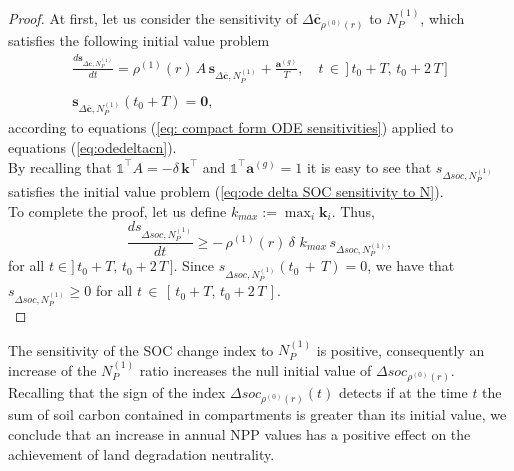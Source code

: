 \begin{proof}
At first, let us consider the sensitivity of $\Delta \mathbf{\overline c}_{\rho^{(0)}(r)}$ to $N_P^{(1)}$, which satisfies the following initial value problem
\begin{equation}\label{eq:ivp sens delta c to N}
\begin{array}{l}
     \displaystyle \frac{d \mathbf{s}_{\Delta \mathbf{\overline c},N_P^{(1)}}}{dt}=\rho^{(1)}(r)\,A\, \mathbf{s}_{\Delta \mathbf{\overline c},N_P^{(1)}}+\displaystyle \frac{\mathbf{a}^{(g)}}{T},\quad t\,\in \,]\,t_0+T,\,t_0+2\,T\,] \\\\
     \mathbf{s}_{\Delta \mathbf{\overline c},N_P^{(1)}}(t_0+T)=\mathbf{0},
\end{array}
\end{equation}
according to equations (\ref{eq: compact form ODE sensitivities}) applied to equations (\ref{eq:odedeltacn}). \\
By recalling that
 $\mathds{1}^\intercal A =-\delta\, \mathbf{k}^\intercal $ and $\mathds{1}^\intercal \mathbf{a}^{(g)}=1$ it is easy to see that $s_{\Delta soc,N_P^{(1)}}$ satisfies the initial value problem (\ref{eq:ode delta SOC sensitivity to N}).\\

\noindent  To complete the proof, let us define $k_{max}:=\max_i{\mathbf{k}_i}$. Thus,
$$ \frac{d s_{\Delta soc,N_P^{(1)}}}{dt}\geq - \,\rho^{(1)}(r)\,\delta \,\,k_{max} \,s_{\Delta soc,N_P^{(1)}}, 
$$
for all $t\in]\,t_0+T,\,t_0+2\,T\,].$ Since 
$s_{\Delta soc,N_P^{(1)}}(t_0\,+\,T)= 0$, we have that 
$s_{\Delta soc,N_P^{(1)}}\geq 0$ for all $t\,\in\,[\,t_0+T,\,t_0+2\,T\,]$.\\
\end{proof}

\begin{remark}
The sensitivity of the SOC change index to $N_P^{(1)}$ is positive, consequently an increase of the  $N_P^{(1)}$ ratio increases the null initial value of $\Delta soc_{\rho^{(0)}(r)}$. Recalling that the sign of the index $\Delta soc_{\rho^{(0)}(r)}(t)$ detects if at the time $t$ the sum of  soil carbon contained in  compartments is greater than its initial value, we conclude that an increase in annual NPP values  
has a positive effect on the achievement of land degradation neutrality. 
\end{remark}

